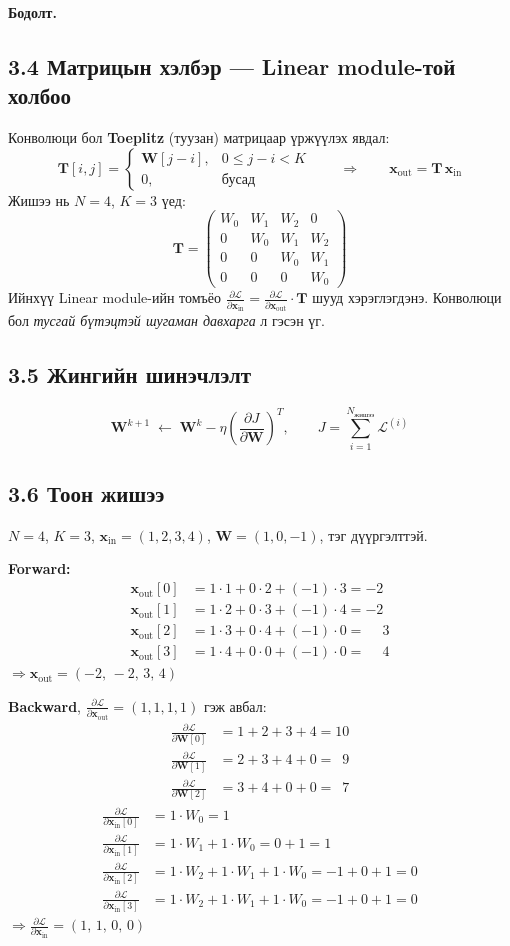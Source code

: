 \documentclass[11pt]{article}
\newenvironment{solution}[1][\textbf{Бодолт.}]
    { \noindent #1 \smallskip \\ }
    { \medskip }
\newcommand{\xin}{\mathbf{x}_{\mathrm{in}}}
\newcommand{\xout}{\mathbf{x}_{\mathrm{out}}}
\newcommand{\dL}[1]{\frac{\partial \mathcal{L}}{\partial #1}}
\begin{document}
\begin{solution}
\subsection*{3.4 Матрицын хэлбэр — Linear module-той холбоо}
Конволюци бол \textbf{Toeplitz} (туузан) матрицаар үржүүлэх явдал:
\[
\mathbf{T}[i,j] =
\begin{cases} \mathbf{W}[j-i], & 0 \le j-i < K \\ 0, & \text{бусад}\end{cases}
\qquad\Longrightarrow\qquad \xout = \mathbf{T}\,\xin
\]
Жишээ нь $N=4$, $K=3$ үед:
\[
\mathbf{T} = \begin{pmatrix}
W_0 & W_1 & W_2 & 0   \\
0   & W_0 & W_1 & W_2 \\
0   & 0   & W_0 & W_1 \\
0   & 0   & 0   & W_0
\end{pmatrix}
\]
Ийнхүү Linear module-ийн томъёо $\dL{\xin} = \dL{\xout}\cdot\mathbf{T}$ шууд хэрэглэгдэнэ.
Конволюци бол \emph{тусгай бүтэцтэй шугаман давхарга} л гэсэн үг.

\subsection*{3.5 Жингийн шинэчлэлт}
\[
\mathbf{W}^{k+1} \;\leftarrow\; \mathbf{W}^{k} - \eta \left(\frac{\partial J}{\partial \mathbf{W}}\right)^{T},
\qquad J = \sum_{i=1}^{N_{\text{жишээ}}} \mathcal{L}^{(i)}
\]

\subsection*{3.6 Тоон жишээ}
$N=4$, $K=3$, $\xin = (1,2,3,4)$, $\mathbf{W} = (1,0,-1)$, тэг дүүргэлттэй.

\textbf{Forward:}
\begin{align*}
\xout[0] &= 1\cdot1 + 0\cdot2 + (-1)\cdot3 = -2 \\
\xout[1] &= 1\cdot2 + 0\cdot3 + (-1)\cdot4 = -2 \\
\xout[2] &= 1\cdot3 + 0\cdot4 + (-1)\cdot0 = \phantom{-}3 \\
\xout[3] &= 1\cdot4 + 0\cdot0 + (-1)\cdot0 = \phantom{-}4
\end{align*}
$\Longrightarrow \xout = (-2,\,-2,\,3,\,4)$

\medskip
\textbf{Backward}, $\dL{\xout} = (1,1,1,1)$ гэж авбал:
\begin{align*}
\dL{\mathbf{W}[0]} &= 1+2+3+4 = 10 \\
\dL{\mathbf{W}[1]} &= 2+3+4+0 = \phantom{1}9 \\
\dL{\mathbf{W}[2]} &= 3+4+0+0 = \phantom{1}7
\end{align*}
\begin{align*}
\dL{\xin[0]} &= 1\cdot W_0 = 1 \\
\dL{\xin[1]} &= 1\cdot W_1 + 1\cdot W_0 = 0 + 1 = 1 \\
\dL{\xin[2]} &= 1\cdot W_2 + 1\cdot W_1 + 1\cdot W_0 = -1+0+1 = 0 \\
\dL{\xin[3]} &= 1\cdot W_2 + 1\cdot W_1 + 1\cdot W_0 = -1+0+1 = 0
\end{align*}
$\Longrightarrow \dL{\xin} = (1,\,1,\,0,\,0)$


\end{solution}
\end{document}

